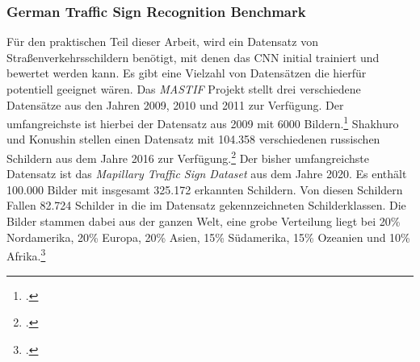 \subsubsection{German Traffic Sign Recognition Benchmark}
Für den praktischen Teil dieser Arbeit, wird ein Datensatz von Straßenverkehrsschildern benötigt, mit denen das \ac{CNN} initial trainiert und bewertet werden kann. Es gibt eine Vielzahl von Datensätzen die hierfür potentiell geeignet wären. Das \textit{\ac{MASTIF}} Projekt stellt drei verschiedene Datensätze aus den Jahren 2009, 2010 und 2011 zur Verfügung. Der umfangreichste ist hierbei der Datensatz aus 2009 mit 6000 Bildern.\footcite[Vgl.][S. 66-73]{vsegvic2010computer} Shakhuro und Konushin stellen einen Datensatz mit 104.358 verschiedenen russischen Schildern aus dem Jahre 2016 zur Verfügung.\footcite[Vgl.][S. 294-300]{rtsd} Der bisher umfangreichste Datensatz ist das \textit{Mapillary Traffic Sign Dataset} aus dem Jahre 2020. Es enthält 100.000 Bilder mit insgesamt 325.172 erkannten Schildern. Von diesen Schildern Fallen 82.724 Schilder in die im Datensatz gekennzeichneten Schilderklassen. Die Bilder stammen dabei aus der ganzen Welt, eine grobe Verteilung liegt bei 20\% Nordamerika, 20\% Europa, 20\% Asien, 15\% Südamerika, 15\% Ozeanien und 10\% Afrika.\footcite[Vgl.][S. 1-17]{ertlerMapillaryTrafficSign2020}

